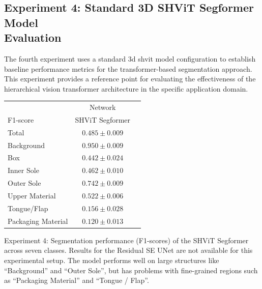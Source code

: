 {\subsection[Experiment 4: Standard 3D SHViT Segformer Model Evaluation]{Experiment 4: Standard 3D SHViT Segformer Model \\ Eva\-luation}
The fourth experiment uses a standard \gls{3d} \gls{shvit} model configuration to establish baseline performance metrics for the transformer-based segmentation approach. This experiment provides a reference point for evaluating the effectiveness of the hierarchical vision transformer architecture in the specific application domain.

\begin{center}
	\begin{threeparttable}[H]
		\begin{tabular}{lcc}
			\toprule[1.5pt]  
			& \multicolumn{1}{c}{Network} \\
			\multicolumn{1}{l}{F1-score} & {SHViT Segformer} \\
			\midrule
			\midrule
			Total              & $0.485 \pm 0.009$ \\
			\midrule
			Background         & $0.950 \pm 0.009$ \\
			Box                & $0.442 \pm 0.024$ \\
			Inner Sole         & $0.462 \pm 0.010$ \\
			Outer Sole         & $0.742 \pm 0.009$ \\
			Upper Material     & $0.522 \pm 0.006$ \\
			Tongue/Flap        & $0.156 \pm 0.028$ \\
			Packaging Material & $0.120 \pm 0.013$ \\
			\bottomrule
		\end{tabular}
		\captionsetup{width=0.95\textwidth}
		\caption[Segmentation performance (F1-scores) of the SHViT Segformer across seven classes]{Experiment 4: Segmentation performance (F1-scores) of the SHViT Segformer across seven classes. Results for the Residual SE UNet are not available for this experimental setup. The model performs well on large structures like \enquote{Background} and \enquote{Outer Sole}, but has problems with fine-grained regions such as \enquote{Packaging Material} and \enquote{Tongue / Flap}.}
		\label{tab:paper_7_segments}
	\end{threeparttable}
\end{center}

}
